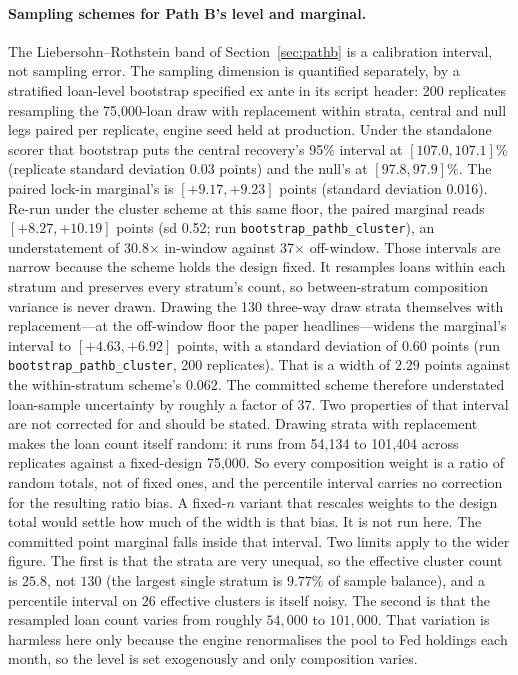 \documentclass[12pt]{article}
\begin{document}
\paragraph{Sampling schemes for Path B's level and marginal.}
The Liebersohn--Rothstein band of Section~\ref{sec:pathb} is a calibration interval, not sampling error. The sampling dimension is quantified separately, by a stratified loan-level bootstrap specified ex ante in its script header: 200 replicates resampling the 75,000-loan draw with replacement within strata, central and null legs paired per replicate, engine seed held at production. Under the standalone scorer that bootstrap puts the central recovery's 95\% interval at $[107.0, 107.1]\%$ (replicate standard deviation 0.03 points) and the null's at $[97.8, 97.9]\%$. The paired lock-in marginal's is $[+9.17, +9.23]$ points (standard deviation 0.016). Re-run under the cluster scheme at this same floor, the paired marginal reads $[+8.27, +10.19]$ points (sd 0.52; run \texttt{bootstrap\_pathb\_cluster}), an understatement of 30.8$\times$ in-window against 37$\times$ off-window. Those intervals are narrow because the scheme holds the design fixed. It resamples loans within each stratum and preserves every stratum's count, so between-stratum composition variance is never drawn. Drawing the 130 three-way draw strata themselves with replacement---at the off-window floor the paper headlines---widens the marginal's interval to $[+4.63, +6.92]$ points, with a standard deviation of $0.60$ points (run \texttt{bootstrap\_pathb\_cluster}, 200 replicates). That is a width of $2.29$ points against the within-stratum scheme's $0.062$. The committed scheme therefore understated loan-sample uncertainty by roughly a factor of $37$. Two properties of that interval are not corrected for and should be stated. Drawing strata with replacement makes the loan count itself random: it runs from 54,134 to 101,404 across replicates against a fixed-design 75,000. So every composition weight is a ratio of random totals, not of fixed ones, and the percentile interval carries no correction for the resulting ratio bias. A fixed-$n$ variant that rescales weights to the design total would settle how much of the width is that bias. It is not run here. The committed point marginal falls inside that interval. Two limits apply to the wider figure. The first is that the strata are very unequal, so the effective cluster count is $25.8$, not $130$ (the largest single stratum is $9.77\%$ of sample balance), and a percentile interval on $26$ effective clusters is itself noisy. The second is that the resampled loan count varies from roughly $54{,}000$ to $101{,}000$. That variation is harmless here only because the engine renormalises the pool to Fed holdings each month, so the level is set exogenously and only composition varies.
\end{document}
